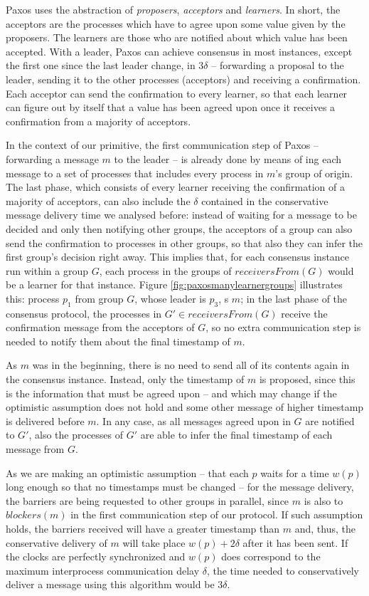 \documentclass[times, 10pt]{article}
\begin{document}
Paxos uses the abstraction of \emph{proposers}, \emph{acceptors} and \emph{learners}. In short, the acceptors are the processes which have to agree upon some value given by the proposers. The learners are those who are notified about which value has been accepted. With a leader, Paxos can achieve consensus in most instances, except the first one since the last leader change, in $3\delta$ -- forwarding a proposal to the leader, sending it to the other processes (acceptors) and receiving a confirmation. Each acceptor can send the confirmation to every learner, so that each learner can figure out by itself that a value has been agreed upon once it receives a confirmation from a majority of acceptors.

In the context of our \cms{} primitive, the first communication step of Paxos -- forwarding a message $m$ to the leader -- is already done by means of \rmc{}ing each message to a set of processes that includes every process in $m$'s group of origin. The last phase, which consists of every learner receiving the confirmation of a majority of acceptors, can also include the $\delta$ contained in the conservative message delivery time we analysed before: instead of waiting for a message to be decided and only then notifying other groups, the acceptors of a group can also send the confirmation to processes in other groups, so that also they can infer the first group's decision right away. This implies that, for each consensus instance run within a group $G$, each process in the groups of $receiversFrom(G)$ would be a learner for that instance. Figure \ref{fig:paxosmanylearnergroups} illustrates this: process $p_1$ from group $G$, whose leader is $p_3$, \cms{}s $m$; in the last phase of the consensus protocol, the processes in $G' \in receiversFrom(G)$ receive the confirmation message from the acceptors of $G$, so no extra communication step is needed to notify them about the final timestamp of $m$.

As $m$ was \rmc{} in the beginning, there is no need to send all of its contents again in the consensus instance. Instead, only the timestamp of $m$ is proposed, since this is the information that must be agreed upon -- and which may change if the optimistic assumption does not hold and some other message of higher timestamp is delivered before $m$. In any case, as all messages agreed upon in $G$ are notified to $G'$, also the processes of $G'$ are able to infer the final timestamp of each message from $G$.

As we are making an optimistic assumption -- that each $p$ waits for a time $w(p)$ long enough so that no timestamps must be changed -- for the message delivery, the barriers are being requested to other groups in parallel, since $m$ is also \rmc{} to $blockers(m)$ in the first communication step of our protocol. If such assumption holds, the barriers received will have a greater timestamp than $m$ and, thus, the conservative delivery of $m$ will take place $w(p) + 2\delta$ after it has been sent. If the clocks are perfectly synchronized and $w(p)$ does correspond to the maximum interprocess communication delay $\delta$, the time needed to conservatively deliver a message using this algorithm would be $3\delta$.
\end{document}
